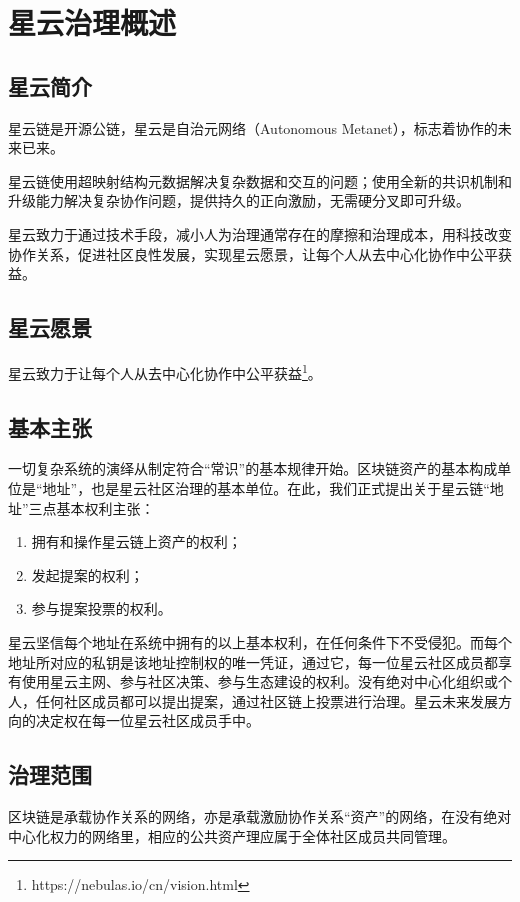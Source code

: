 \section{星云治理概述}

\subsection{星云简介}

星云链是开源公链，星云是自治元网络（Autonomous Metanet），标志着协作的未来已来。

星云链使用超映射结构元数据解决复杂数据和交互的问题；使用全新的共识机制和升级能力解决复杂协作问题，提供持久的正向激励，无需硬分叉即可升级。

星云致力于通过技术手段，减小人为治理通常存在的摩擦和治理成本，用科技改变协作关系，促进社区良性发展，实现星云愿景，让每个人从去中心化协作中公平获益。

\subsection{星云愿景}
星云致力于让每个人从去中心化协作中公平获益\footnote{https://nebulas.io/cn/vision.html}。

\subsection{基本主张}
一切复杂系统的演绎从制定符合“常识”的基本规律开始。区块链资产的基本构成单位是“地址”，也是星云社区治理的基本单位。在此，我们正式提出关于星云链“地址”三点基本权利主张：
\begin{enumerate}
	\item 拥有和操作星云链上资产的权利；
	\item 发起提案的权利；
	\item 参与提案投票的权利。
\end{enumerate}
星云坚信每个地址在系统中拥有的以上基本权利，在任何条件下不受侵犯。而每个地址所对应的私钥是该地址控制权的唯一凭证，通过它，每一位星云社区成员都享有使用星云主网、参与社区决策、参与生态建设的权利。没有绝对中心化组织或个人，任何社区成员都可以提出提案，通过社区链上投票进行治理。星云未来发展方向的决定权在每一位星云社区成员手中。

\subsection{治理范围}
区块链是承载协作关系的网络，亦是承载激励协作关系“资产”的网络，在没有绝对中心化权力的网络里，相应的公共资产理应属于全体社区成员共同管理。

